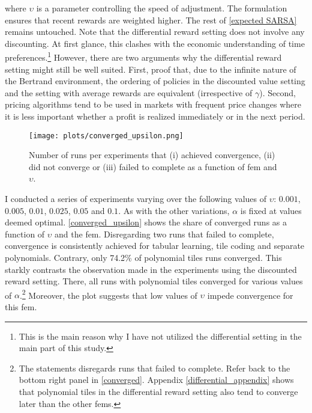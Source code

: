 where $\upsilon$ is a parameter controlling the speed of adjustment. The formulation ensures that recent rewards are weighted higher. The rest of \autoref{expected SARSA} remains untouched. Note that the differential reward setting does not involve any discounting. At first glance, this clashes with the economic understanding of time preferences.\footnote{This is the main reason why I have not utilized the differential setting in the main part of this study.} However, there are two arguments why the differential reward setting might still be well suited. First, \textcite{sutton_reinforcement_2018} proof that, due to the infinite nature of the Bertrand environment, the ordering of policies in the discounted value setting and the setting with average rewards are equivalent (irrespective of $\gamma$). Second, pricing algorithms tend to be used in markets with frequent price changes where it is less important whether a profit is realized immediately or in the next period.


\begin{figure}
	\texttt{[image: plots/converged\_upsilon.png]}
	\caption[Converged runs by \gls{fem} and $\upsilon$]{Number of runs per experiments that (i) achieved convergence, (ii) did not converge or (iii) failed to complete as a function of \gls{fem} and $\upsilon$.}
	\label{converged_upsilon}
\end{figure}

I conducted a series of experiments varying over the following values of $\upsilon$: $0.001$, $0.005$, $0.01$, $0.025$, $0.05$ and $0.1$. As with the other variations, $\alpha$ is fixed at values deemed optimal. \autoref{converged_upsilon} shows the share of converged runs as a function of $\upsilon$ and the \gls{fem}. Disregarding two runs that failed to complete, convergence is consistently achieved for tabular learning, tile coding and separate polynomials. Contrary, only 74.2\% of polynomial tiles runs converged. This starkly contrasts the observation made in the experiments using the discounted reward setting. There, all runs with polynomial tiles converged for various values of $\alpha$.\footnote{The statements disregards runs that failed to complete. Refer back to the bottom right panel in \autoref{converged}. Appendix \ref{differential_appendix} shows that polynomial tiles in the differential reward setting also tend to converge later than the other \gls{fem}s.} Moreover, the plot suggests that low values of $\upsilon$ impede convergence for this \gls{fem}.


